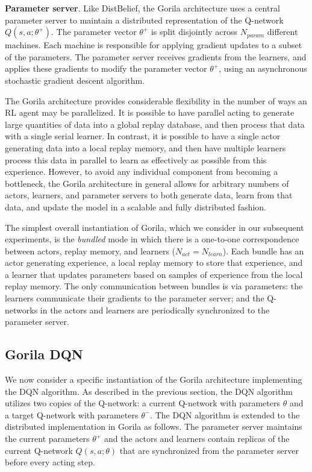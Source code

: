 {\bf Parameter server}. Like DistBelief, the Gorila architecture uses a central parameter server to maintain a distributed representation of the Q-network $Q(s,a; \theta^+)$. The parameter vector $\theta^+$ is split disjointly across $N_{param}$ different machines. Each machine is responsible for applying gradient updates to a subset of the parameters. The parameter server receives gradients from the learners, and applies these gradients to modify the parameter vector $\theta^+$, using an asynchronous stochastic gradient descent algorithm. 

The Gorila architecture provides considerable flexibility in the number of ways an RL agent may be parallelized. It is possible to have parallel acting to generate large quantities of data into a global replay database, and then process that data with a single serial learner. In contrast, it is possible to have a single actor generating data into a local replay memory, and then have multiple learners process this data in parallel to learn as effectively as possible from this experience. However, to avoid any individual component from becoming a bottleneck, the Gorila architecture in general allows for arbitrary numbers of actors, learners, and parameter servers to both generate data, learn from that data, and update the model in a scalable and fully distributed fashion.

The simplest overall instantiation of Gorila, which we consider in our subsequent experiments, is the \emph{bundled} mode in which there is a one-to-one correspondence between actors, replay memory, and learners ($N_{act} = N_{learn}$). Each bundle has an actor generating experience, a local replay memory to store that experience, and a learner that updates parameters based on samples of experience from the local replay memory. The only communication between bundles is via parameters: the learners communicate their gradients to the parameter server; and the Q-networks in the actors and learners are periodically synchronized to the parameter server.

\subsection{Gorila DQN}

We now consider a specific instantiation of the Gorila architecture implementing the DQN algorithm.
As described in the previous section, the DQN algorithm utilizes two copies of the Q-network: a current Q-network with parameters $\theta$ and a target Q-network with parameters $\theta^-$.
The DQN algorithm is extended to the distributed implementation in Gorila as follows.
The parameter server maintains the current parameters $\theta^+$ and the actors and learners contain replicas of the current Q-network $Q(s,a;\theta)$ that are synchronized from the parameter server before every acting step.


